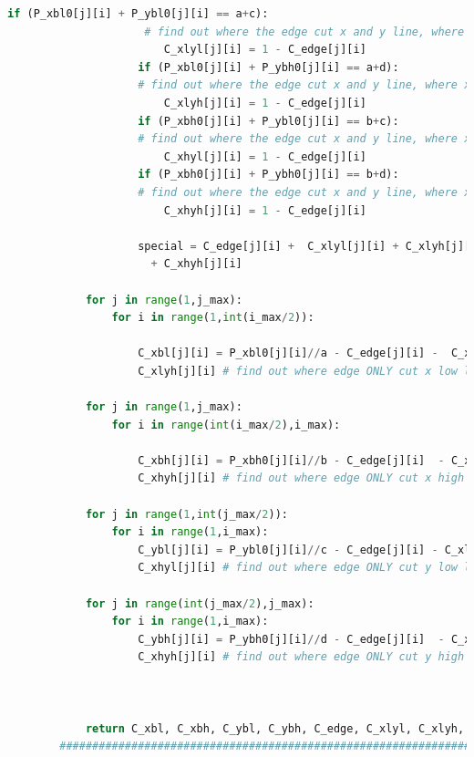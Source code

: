 \documentclass[12pt]{article}
\begin{document}
\begin{scriptsize}
\begin{lstlisting}[language=python,caption={Python code--Functions for Grid Generator}]
                    if (P_xbl0[j][i] + P_ybl0[j][i] == a+c):    
                     # find out where the edge cut x and y line, where x low y low -->C_xlyl
                        C_xlyl[j][i] = 1 - C_edge[j][i]
                    if (P_xbl0[j][i] + P_ybh0[j][i] == a+d):   
                    # find out where the edge cut x and y line, where x low y high -->C_xlyh
                        C_xlyh[j][i] = 1 - C_edge[j][i]
                    if (P_xbh0[j][i] + P_ybl0[j][i] == b+c):   
                    # find out where the edge cut x and y line, where x high y low -->C_xhyl
                        C_xhyl[j][i] = 1 - C_edge[j][i]
                    if (P_xbh0[j][i] + P_ybh0[j][i] == b+d):   
                    # find out where the edge cut x and y line, where x high y high -->C_xhyh
                        C_xhyh[j][i] = 1 - C_edge[j][i]
                    
                    special = C_edge[j][i] +  C_xlyl[j][i] + C_xlyh[j][i] + C_xhyl[j][i]\
                      + C_xhyh[j][i]
                
            for j in range(1,j_max):
                for i in range(1,int(i_max/2)):
        
                    C_xbl[j][i] = P_xbl0[j][i]//a - C_edge[j][i] -  C_xlyl[j][i] - \
                    C_xlyh[j][i] # find out where edge ONLY cut x low lines 
            
            for j in range(1,j_max):
                for i in range(int(i_max/2),i_max):
        
                    C_xbh[j][i] = P_xbh0[j][i]//b - C_edge[j][i]  - C_xhyl[j][i] - \
                    C_xhyh[j][i] # find out where edge ONLY cut x high lines 
        
            for j in range(1,int(j_max/2)):
                for i in range(1,i_max):
                    C_ybl[j][i] = P_ybl0[j][i]//c - C_edge[j][i] - C_xlyl[j][i]  - \
                    C_xhyl[j][i] # find out where edge ONLY cut y low lines
        
            for j in range(int(j_max/2),j_max):
                for i in range(1,i_max):
                    C_ybh[j][i] = P_ybh0[j][i]//d - C_edge[j][i]  - C_xlyh[j][i]  - \
                    C_xhyh[j][i] # find out where edge ONLY cut y high lines 
        
            
        
            return C_xbl, C_xbh, C_ybl, C_ybh, C_edge, C_xlyl, C_xlyh, C_xhyl, C_xhyh
        ##########################################################################################
        

\end{lstlisting}
\end{scriptsize}
\end{document}
